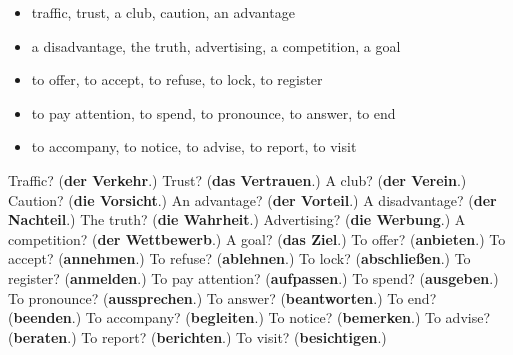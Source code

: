 \begin{itemize}
\raggedright
  \item traffic, trust, a club, caution, an advantage
  \item a disadvantage, the truth, advertising, a competition, a goal
  \item to offer, to accept, to refuse, to lock, to register
  \item to pay attention, to spend, to pronounce, to answer, to end
  \item to accompany, to notice, to advise, to report, to visit
\end{itemize}

\begin{tcolorbox}[breakable,colback=teal!4,colframe=teal!35!black,title={Before you move on}]
Traffic? (\textbf{der Verkehr}.) Trust? (\textbf{das Vertrauen}.) A club? (\textbf{der Verein}.) Caution? (\textbf{die Vorsicht}.) An advantage? (\textbf{der Vorteil}.) A disadvantage? (\textbf{der Nachteil}.) The truth? (\textbf{die Wahrheit}.) Advertising? (\textbf{die Werbung}.) A competition? (\textbf{der Wettbewerb}.) A goal? (\textbf{das Ziel}.) To offer? (\textbf{anbieten}.) To accept? (\textbf{annehmen}.) To refuse? (\textbf{ablehnen}.) To lock? (\textbf{abschließen}.) To register? (\textbf{anmelden}.) To pay attention? (\textbf{aufpassen}.) To spend? (\textbf{ausgeben}.) To pronounce? (\textbf{aussprechen}.) To answer? (\textbf{beantworten}.) To end? (\textbf{beenden}.) To accompany? (\textbf{begleiten}.) To notice? (\textbf{bemerken}.) To advise? (\textbf{beraten}.) To report? (\textbf{berichten}.) To visit? (\textbf{besichtigen}.)
\end{tcolorbox}

